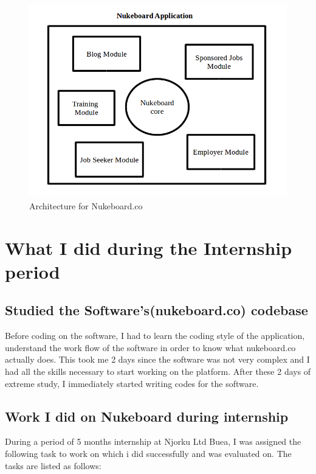 \begin{figure}[h]
\centering
\includegraphics[width=13cm,scale=1.5]{Figures/NukeboardArchitecture}
\decoRule
\caption[Nukeboard Architecture Model]{Architecture for Nukeboard.co}
\label{fig:NukeboardArchitecture}
\end{figure}


\section{What I did during the Internship period}
\subsection{Studied the Software's(nukeboard.co) codebase}

Before coding on the software, I had to learn the coding style of the application, understand the work flow of the software in order to know what nukeboard.co actually does. This took me 2 days since the software was not very complex and I had all the skills necessary to start working on the platform. After these 2 days of extreme study, I immediately started writing codes for the software.

\subsection{Work I did on Nukeboard during internship}

During a period of 5 months internship at Njorku Ltd Buea, I was assigned the following task to work on which i did successfully and was evaluated on. The tasks are listed as follows:

